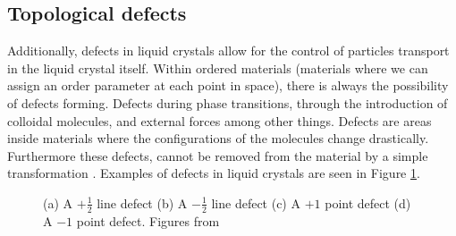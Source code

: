 \documentclass[preprint, aps]{revtex4-1}
\begin{document}
\subsection*{Topological defects}
Additionally, defects in liquid crystals allow for the control of particles 
transport in the liquid crystal itself. Within ordered materials (materials 
where we can assign an order parameter at each point in space), there is always 
the possibility of defects forming. Defects during phase transitions, through 
the introduction of colloidal molecules, and external forces among other things.
Defects are areas inside materials where the configurations of the molecules
change drastically. Furthermore these defects, cannot be removed from the 
material by a simple transformation \cite{mermin79}. Examples of defects in 
liquid crystals are seen in Figure \ref{fig:defects}.
	\begin{figure}[H]
		\centering

		\caption{(a) A $+\frac{1}{2}$ line defect (b) A $-\frac{1}{2}$ line
		defect (c) A $+1$ point defect (d) A $-1$ point defect. Figures from
		\cite{chuang91}}
		\label{fig:defects}
	\end{figure}
\end{document}
